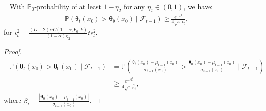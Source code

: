 \documentclass[final,12pt]{colt2026} %
\begin{document}
\begin{lemma}~\label{lem:LB}
    With $\mathbb{P}_0$-probability of at least $1-\eta_2$ for any $\eta_2\in(0,1)$, we have:
    \begin{align}
        \mathbb{P} (\pmb \theta_t(x_0) > \pmb \theta_0(x_0)\mid \mathcal{F}_{t-1} ) \geq \frac{e^{-\iota_t^2}}{4\sqrt{\pi} \iota_t},
    \end{align}
    for $\iota_t^2 = \frac{(D+2)\alpha C(1-\alpha,\pmb\theta_0,k)}{ (1-\alpha)\eta_2}   t\epsilon_t^2$.
\end{lemma}
\begin{proof}    

\begin{align}
\begin{split}
\mathbb{P} (\pmb \theta_t(x_0) > \pmb \theta_0(x_0)  \mid \mathcal{F}_{t-1} ) &= \mathbb{P} \left(\frac{\pmb \theta_t(x_0) - \mu_{t-1}(x_0)}{\sigma_{t-1}(x_0)} > \frac{\pmb \theta_0(x_0)- \mu_{t-1}(x_0)}{\sigma_{t-1}(x_0)}\;\Big|\;\mathcal{F}_{t-1} \right)
    \\
    &\geq \frac{e^{-\beta_t^2}}{4\sqrt{\pi} \beta_t},
\end{split}
\end{align}
where $\beta_t=\frac{|\pmb \theta_0(x_0)- \mu_{t-1}(x_0)|}{\sigma_{t-1}(x_0)}$. %


\end{proof}
\end{document}
